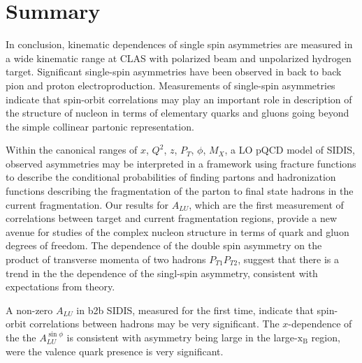 \documentclass[11pt,a4paper]{article}
\newcommand{\xbj}{\mathrm{x_{B}}}
\begin{document}
\section{Summary}

In conclusion, kinematic dependences of single spin asymmetries
are measured in a wide kinematic range at CLAS with polarized beam and unpolarized hydrogen  target. 
Significant single-spin asymmetries 
have been observed in back to back pion and proton
electroproduction.
Measurements of single-spin asymmetries indicate that spin-orbit correlations
may play an important role in description  of the structure of nucleon
in terms of elementary quarks and gluons going beyond the simple 
collinear partonic representation.

Within the canonical ranges of $x$, $Q^2$, $z$, $P_T$, $\phi$, 
$M_X$, a LO pQCD model of SIDIS, observed asymmetries may be interpreted in a framework
using fracture functions to describe the conditional probabilities of finding partons and hadronization functions
describing the fragmentation of the parton to final state hadrons in the current fragmentation.
Our results for $A_{LU}$, which are the first measurement of correlations between
target and current fragmentation regions, provide a new avenue for studies of the complex nucleon structure
in terms of quark and gluon degrees of freedom.
The dependence of the double spin asymmetry on the product of transverse momenta of two hadrons $P_{T1}P_{T2}$,  
suggest  that there is a trend in the
the dependence of the singl-spin asymmetry, consistent with expectations from theory.

A non-zero $A_{LU}$ in b2b SIDIS,  measured for the first time, indicate
that spin-orbit correlations  between hadrons
may be very significant.
The $x$-dependence of the the $A_{LU}^{\sin \phi}$ is consistent with asymmetry being large in the large-$\xbj$ region,
were the valence quark presence is very significant.

%

\end{document}
